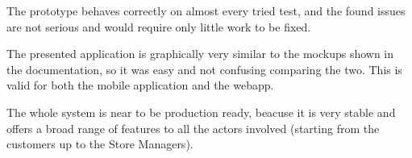 The prototype behaves correctly on almost every tried test, and the found issues are not serious and would require only little work to be fixed.

The presented application is graphically very similar to the mockups shown in the documentation, so it was easy and not confusing comparing the two. This is valid for both the mobile application and the webapp.

The whole system is near to be production ready, beacuse it is very stable and offers a broad range of features to all the actors involved (starting from the customers 
up to the Store Managers).